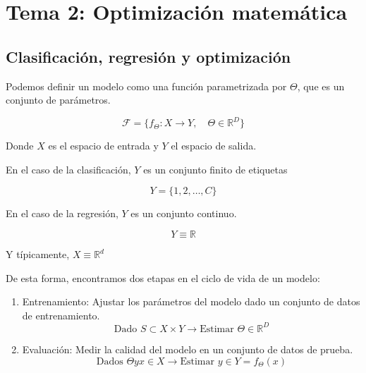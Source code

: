 \chapter{Tema 2: Optimización matemática}

\section{Clasificación, regresión y optimización}

Podemos definir un modelo como una función parametrizada por $\Theta$,
que es un conjunto de parámetros.

$$ \mathcal{F} = \{ f_\Theta : X \rightarrow Y, \quad \Theta \in \mathbb{R}^D \} $$

Donde $X$ es el espacio de entrada y $Y$ el espacio de salida.

En el caso de la clasificación, $Y$ es un conjunto finito de etiquetas

$$ Y = \{1, 2, \ldots, C\} $$

En el caso de la regresión, $Y$ es un conjunto continuo.

$$ Y \equiv \mathbb{R} $$

Y típicamente, $X \equiv \mathbb{R}^d$

De esta forma, encontramos dos etapas en el ciclo de vida de un modelo:

\begin{enumerate}
    \item Entrenamiento: Ajustar los parámetros del modelo dado un conjunto de datos de entrenamiento.
    $$\text{Dado } S \subset X \times Y \rightarrow \text{Estimar } \Theta \in \mathbb{R}^D$$
    \item Evaluación: Medir la calidad del modelo en un conjunto de datos de prueba.
    $$\text{Dados } \Theta y x \in X \rightarrow \text{Estimar } y \in Y = f_\Theta (x)$$
\end{enumerate}